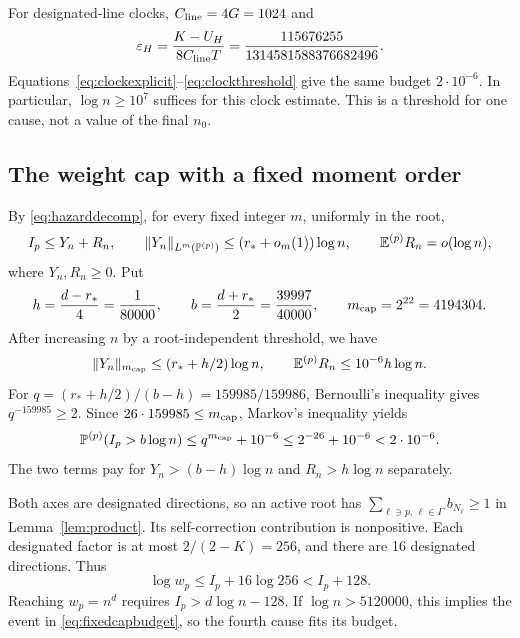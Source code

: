 For designated-line clocks, \(C_{\rm line}=4G=1024\) and
\[
 \varepsilon_H=\frac{K-U_H}{8C_{\rm line}T}
 =\frac{115676255}{1314581588376682496}.
\]
Equations~\eqref{eq:clockexplicit}--\eqref{eq:clockthreshold} give
the same budget \(2\cdot10^{-6}\). In particular,
\(\log n\ge10^7\) suffices for this clock estimate. This is a
threshold for one cause, not a value of the final \(n_0\).

\subsection{The weight cap with a fixed moment order}
By \eqref{eq:hazarddecomp}, for every fixed integer \(m\), uniformly
in the root,
\[
 I_p\le Y_n+R_n,\qquad
 \|Y_n\|_{L^m(\mathbb P^{(p)})}\le(r_*+o_m(1))\log n,
 \qquad \mathbb E^{(p)}R_n=o(\log n),
\]
where \(Y_n,R_n\ge0\). Put
\[
 h=\frac{d-r_*}{4}=\frac1{80000},\qquad
 b=\frac{d+r_*}{2}=\frac{39997}{40000},\qquad
 m_{\rm cap}=2^{22}=4194304.
\]
After increasing \(n\) by a root-independent threshold, we have
\begin{equation}\label{eq:fixedriskmoment}
 \|Y_n\|_{m_{\rm cap}}\le(r_*+h/2)\log n,\qquad
 \mathbb E^{(p)}R_n\le10^{-6}h\log n.
\end{equation}
For \(q=(r_*+h/2)/(b-h)=159985/159986\), Bernoulli's inequality
gives \(q^{-159985}\ge2\). Since \(26\cdot159985\le m_{\rm cap}\),
Markov's inequality yields
\begin{equation}\label{eq:fixedcapbudget}
 \mathbb P^{(p)}(I_p>b\log n)
 \le q^{m_{\rm cap}}+10^{-6}
 \le2^{-26}+10^{-6}<2\cdot10^{-6}.
\end{equation}
The two terms pay for \(Y_n>(b-h)\log n\) and \(R_n>h\log n\)
separately.

Both axes are designated directions, so an active root has
\(\sum_{\ell\ni p,\,\ell\in\Gamma} b_{N_\ell}\ge1\) in
Lemma~\ref{lem:product}. Its self-correction
contribution is nonpositive. Each designated factor is at most
\(2/(2-K)=256\), and there are 16 designated directions. Thus
\[
 \log w_p\le I_p+16\log256<I_p+128.
\]
Reaching \(w_p=n^d\) requires \(I_p>d\log n-128\).
If \(\log n>5120000\), this implies the event in
\eqref{eq:fixedcapbudget}, so the fourth cause fits its budget.

